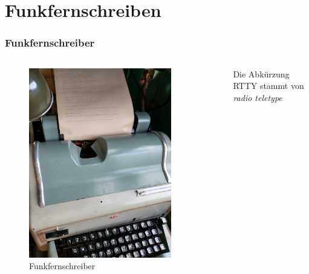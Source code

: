 
\section{Funkfernschreiben}
\label{section:funkfernschreiben}
\begin{frame}%

\frametitle{Funkfernschreiber}
\begin{columns}
    \begin{column}{0.48\textwidth}
    
\begin{figure}
    \includegraphics[width=0.85\textwidth]{foto/92}
    \caption{\scriptsize Funkfernschreiber}
    \label{n_computersteuerung_funkfernschreiber}
\end{figure}

    \end{column}
   \begin{column}{0.48\textwidth}
       Die Abkürzung RTTY stammt von \emph{radio teletype}


   \end{column}
\end{columns}

\end{frame}


